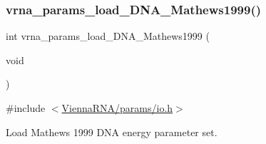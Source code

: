 \subsubsection{\texorpdfstring{vrna\_params\_load\_DNA\_Mathews1999()}{vrna\_params\_load\_DNA\_Mathews1999()}}
{\footnotesize\ttfamily int vrna\+\_\+params\+\_\+load\+\_\+\+D\+N\+A\+\_\+\+Mathews1999 (\begin{DoxyParamCaption}\item[{void}]{ }\end{DoxyParamCaption})}



{\ttfamily \#include $<$\mbox{\hyperlink{io_8h}{Vienna\+R\+N\+A/params/io.\+h}}$>$}



Load Mathews 1999 D\+NA energy parameter set. 


